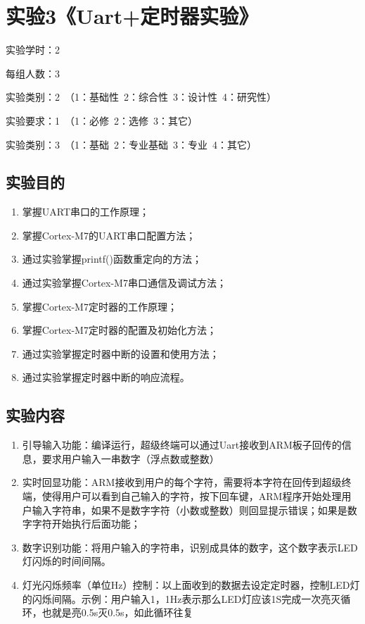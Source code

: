﻿\documentclass[UTF8,12pt]{article}
\begin{document}
\newpage

\section{实验3《Uart+定时器实验》}

实验学时：2

每组人数：3

实验类别：2\ （1：基础性\ 2：综合性\ 3：设计性\ 4：研究性）

实验要求：1\ （1：必修\ 2：选修\ 3：其它）

实验类别：3\ （1：基础\ 2：专业基础\ 3：专业\ 4：其它）

\subsection{实验目的}
\begin{enumerate}
  \item 掌握UART串口的工作原理；
  \item 掌握Cortex-M7的UART串口配置方法；
  \item 通过实验掌握printf()函数重定向的方法；
  \item 通过实验掌握Cortex-M7串口通信及调试方法；
  \item 掌握Cortex-M7定时器的工作原理；
  \item 掌握Cortex-M7定时器的配置及初始化方法；
  \item 通过实验掌握定时器中断的设置和使用方法；
  \item 通过实验掌握定时器中断的响应流程。
\end{enumerate}

\subsection{实验内容}
\begin{enumerate}
  \item 引导输入功能：编译运行，超级终端可以通过Uart接收到ARM板子回传的信息，要求用户输入一串数字（浮点数或整数）
  \item 实时回显功能：ARM接收到用户的每个字符，需要将本字符在回传到超级终端，使得用户可以看到自己输入的字符，按下回车键，ARM程序开始处理用户输入字符串，如果不是数字字符（小数或整数）则回显提示错误；如果是数字字符开始执行后面功能；
  \item 数字识别功能：将用户输入的字符串，识别成具体的数字，这个数字表示LED灯闪烁的时间间隔。
  \item 灯光闪烁频率（单位Hz）控制：以上面收到的数据去设定定时器，控制LED灯的闪烁间隔。示例：用户输入1，1Hz表示那么LED灯应该1S完成一次亮灭循环，也就是亮0.5s灭0.5s，如此循环往复
\end{enumerate}
\end{document}
